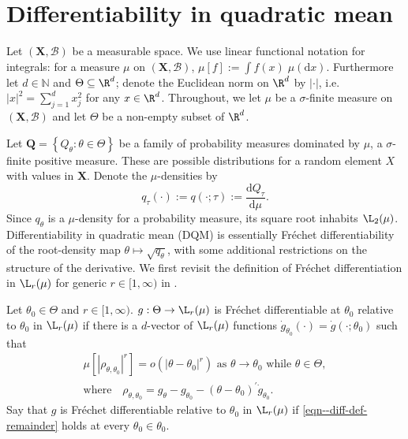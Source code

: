 
\section{Differentiability in quadratic mean}
\label{sec--dqm-def}

Let \((\mathbf{X}, \mathcal{B})\) be a measurable space.
We use linear functional notation for integrals: for a measure \(\mu\) on
\((\mathbf{X}, \mathcal{B})\), \(\mu [f] := \int f (x) \; \mu (\mathrm{d} x)\).
Furthermore let \(d \in \mathbb{N}\) and \(\Theta \subseteq \R^{d}\); denote the
Euclidean norm on \(\R^{d}\) by \(|\cdot|\), i.e. \(|x|^{2} = \sum_{j = 1}^{d}
x_{j}^{2}\) for any \(x \in \R^{d}\).
Throughout, we let \(\mu\) be a \(\sigma\)-finite measure on \((\mathbf{X},
\mathcal{B})\) and let \(\Theta\) be a non-empty subset of \(\R^{d}\).

Let \(\mathbf{Q} = \left\{ Q_{\theta} : \theta \in \Theta \right\}\) be a family
of probability measures dominated by \(\mu\), a \(\sigma\)-finite positive
measure.
These are possible distributions for a random element \(X\) with values in
\(\mathbf{X}\).
Denote the \(\mu\)-densities by
\begin{equation}
  q_{\tau} (\cdot) := q (\cdot; \tau) := \frac{\mathrm{d}
  Q_{\tau}}{\mathrm{d} \mu}.
  \label{eqn--q-density-and-sqrt}
\end{equation}
Since \(q_{\theta}\) is a \(\mu\)-density for a probability measure, its square
root inhabits \(\L_{2} (\mu)\).
Differentiability in quadratic mean (DQM) is essentially Fr\'echet
differentiability of the root-density map \(\theta \mapsto \sqrt{q_{\theta}}\),
with some additional restrictions on the structure of the derivative.
We first revisit the definition of Fr\'echet differentiation in
\(\L_{r} (\mu)\) for generic \(r \in [1, \infty)\) in
.

\begin{definition}
\label{def--frechet-diff-relative}
Let \(\theta_{0} \in \Theta\) and \(r \in [1, \infty)\).
\(g : \Theta \to \L_{r} (\mu)\) is Fr\'echet differentiable at
\(\theta_{0}\) relative to \(\theta_{0}\) in \(\L_{r} (\mu)\) if there
is a \(d\)-vector of \(\L_{r} (\mu)\) functions \(\dot{g}_{\theta_{0}}
(\cdot) = \dot{g} \left( \cdot; \theta_{0} \right)\) such that
\begin{equation}
  \begin{gathered}
    \mu \left[ \left| \rho_{\theta, \theta_{0}} \right|^{r} \right] = o \left(
    \left| \theta - \theta_{0} \right|^{r} \right) \text{ as } \theta \to
    \theta_{0} \text{ while } \theta \in \Theta, \\
    \text{where} \quad
    \rho_{\theta, \theta_{0}} = g_{\theta} - g_{\theta_{0}} - \left(
    \theta - \theta_{0} \right)^{\prime} \dot{g}_{\theta_{0}}.
  \end{gathered}
  \label{eqn--diff-def-remainder}
\end{equation}
Say that \(g\) is Fr\'echet differentiable relative to \(\theta_{0}\) in
\(\L_{r} (\mu)\) if \eqref{eqn--diff-def-remainder} holds at every
\(\theta_{0} \in \theta_{0}\).
\end{definition}

